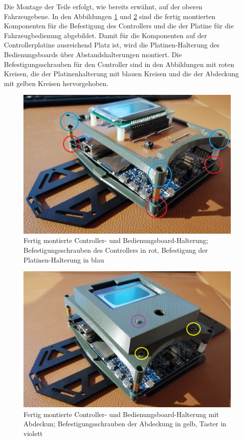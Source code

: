 Die Montage der Teile erfolgt, wie bereits erwähnt, auf der oberen Fahrzeugebene. In den Abbildungen \ref{fig:ControllerMontage} und \ref{fig:AbdeckungMontage} sind die fertig montierten Komponenten für die Befestigung des Controllers und die der Platine für die Fahrzeugbedienung abgebildet. Damit für die Komponenten auf der Controllerplatine ausreichend Platz ist, wird die Platinen-Halterung des Bedienungsboards über Abstandshalterungen montiert. Die Befestigungsschrauben für den Controller sind in den Abbildungen mit roten Kreisen, die der Platinenhalterung mit blauen Kreisen und die der Abdeckung mit gelben Kreisen hervorgehoben.

\begin{figure}[H] %
\includegraphics[width=.8\textwidth]{sec2/images/3DAnbaukomponenten/Montagebilder/ControllerMontage} 
\centering
\captionsetup{width=.95\textwidth}
\caption[Fertig montierte Controller- und Bedienungsboard-Halterung]{Fertig montierte Controller- und Bedienungsboard-Halterung; Befestigungsschrauben des Controllers in rot, Befestigung der Platinen-Halterung in blau}\centering
\label{fig:ControllerMontage}
\end{figure}

\begin{figure}[H] %
\includegraphics[width=.8\textwidth]{sec2/images/3DAnbaukomponenten/Montagebilder/AbdeckungMontage} 
\centering
\captionsetup{width=.95\textwidth}
\caption[Fertig montierte Controller- und Bedienungsboard-Halterung mit Abdeckung]{Fertig montierte Controller- und Bedienungsboard-Halterung mit Abdeckun; Befestigungsschrauben der Abdeckung in gelb, Taster in violett}\centering
\label{fig:AbdeckungMontage}
\end{figure}

